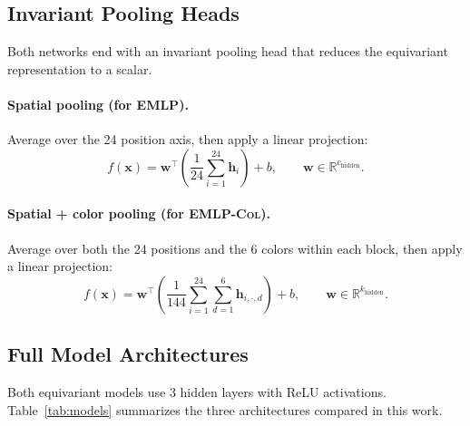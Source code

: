 \documentclass[11pt]{article}
\newcommand{\bx}{\mathbf{x}}
\newcommand{\bh}{\mathbf{h}}
\newcommand{\R}{\mathbb{R}}
\begin{document}
\subsection{Invariant Pooling Heads}

Both networks end with an invariant pooling head that reduces the
equivariant representation to a scalar.

\paragraph{Spatial pooling (for \textsc{EMLP}).}
Average over the 24 position axis, then apply a linear projection:
\begin{equation}
  f(\bx) = \mathbf{w}^\top \!\left(\frac{1}{24}\sum_{i=1}^{24} \bh_i\right) + b,
  \qquad \mathbf{w} \in \R^{c_{\mathrm{hidden}}}.
  \label{eq:invlinear}
\end{equation}

\paragraph{Spatial + color pooling (for \textsc{EMLP-Col}).}
Average over both the 24 positions and the 6 colors within each block,
then apply a linear projection:
\begin{equation}
  f(\bx) = \mathbf{w}^\top \!\left(\frac{1}{144}\sum_{i=1}^{24}\sum_{d=1}^{6}
            \bh_{i,\cdot,d}\right) + b,
  \qquad \mathbf{w} \in \R^{k_{\mathrm{hidden}}}.
  \label{eq:invhead}
\end{equation}

\subsection{Full Model Architectures}

Both equivariant models use 3 hidden layers with ReLU activations.
Table~\ref{tab:models} summarizes the three architectures compared in this work.
\end{document}

